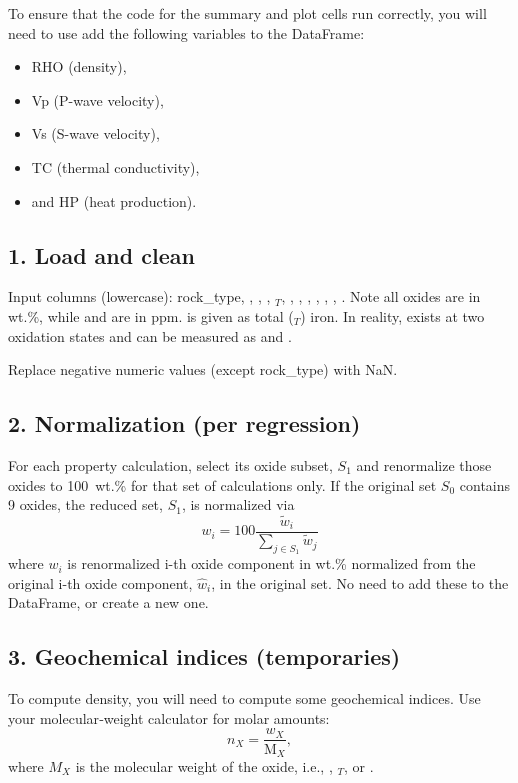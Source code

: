 \documentclass[11pt,a4paper]{article}
\begin{document}
To ensure that the code for the summary and plot cells run correctly, you will need to use add the following variables to the DataFrame:
\begin{itemize}[itemsep=0.1em]
  \item RHO (density),
  \item Vp (P-wave velocity),
  \item Vs (S-wave velocity),
  \item TC (thermal conductivity),
  \item and HP (heat production).
\end{itemize}

\subsection*{1. Load and clean}
Input columns (lowercase): rock\_type, , , , $_{T}$, , , , , , , .  Note all oxides are in wt.\%, while  and  are in ppm.   is given as total ($_T$) iron.  In reality,  exists at two oxidation states and can be measured as  and .

Replace negative numeric values (except rock\_type) with NaN.

\subsection*{2. Normalization (per regression)}
For each property calculation, select its oxide subset, \(S_1\) and renormalize those oxides to 100~wt.\% for that set of calculations only.  If the original set \(S_0\) contains 9 oxides, the reduced set, \(S_1\), is normalized via
\[
  w_i = 100 \frac{\tilde{w}_i}{\sum_{j\in S_1} \tilde{w}_j}
\]
where $w_i$ is renormalized i-th oxide component in wt.\% normalized from the original i-th oxide component, $\hat{w}_i$, in the original set.  No need to add these to the DataFrame, or create a new one.

\subsection*{3. Geochemical indices (temporaries)}
To compute density, you will need to compute some geochemical indices.  Use your molecular‐weight calculator for molar amounts:
\[
  n_X = \frac{w_X}{\mathrm{M}_X},
\]
where $M_X$ is the molecular weight of the oxide, i.e., , $_{T}$, or .
\end{document}
